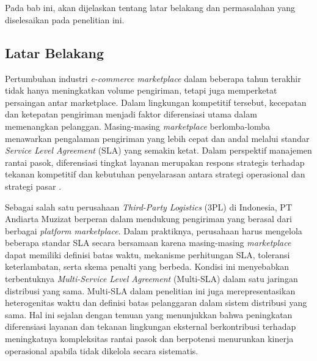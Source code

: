 \chapter{\babSatu}
\label{bab:1}
Pada bab ini, akan dijelaskan tentang latar belakang dan permasalahan yang diselesaikan pada penelitian ini.


\section{Latar Belakang}
\label{sec:latarBelakang}

Pertumbuhan industri \textit{e-commerce marketplace} dalam beberapa tahun terakhir tidak hanya meningkatkan volume pengiriman, tetapi juga memperketat persaingan antar marketplace. Dalam lingkungan kompetitif tersebut, kecepatan dan ketepatan pengiriman menjadi faktor diferensiasi utama dalam memenangkan pelanggan. Masing-masing \textit{marketplace} berlomba-lomba menawarkan pengalaman pengiriman yang lebih cepat dan andal melalui standar \textit{Service Level Agreement} (SLA) yang semakin ketat. Dalam perspektif manajemen rantai pasok, diferensiasi tingkat layanan merupakan respons strategis terhadap tekanan kompetitif dan kebutuhan penyelarasan antara strategi operasional dan strategi pasar \citep{book:chopra}.

Sebagai salah satu perusahaan \textit{Third-Party Logistics }(3PL) di Indonesia, PT Andiarta Muzizat berperan dalam mendukung pengiriman yang berasal dari berbagai \textit{platform marketplace}. Dalam praktiknya, perusahaan harus mengelola beberapa standar SLA secara bersamaan karena masing-masing \textit{marketplace} dapat memiliki definisi batas waktu, mekanisme perhitungan SLA, toleransi keterlambatan, serta skema penalti yang berbeda. Kondisi ini menyebabkan terbentuknya \textit{Multi-Service Level Agreement} (Multi-SLA) dalam satu jaringan distribusi yang sama. Multi-SLA dalam penelitian ini juga merepresentasikan heterogenitas  waktu dan definisi batas pelanggaran dalam sistem distribusi yang sama. Hal ini sejalan dengan temuan \citep{ates2022} yang menunjukkan bahwa peningkatan diferensiasi layanan dan tekanan lingkungan eksternal berkontribusi terhadap meningkatnya kompleksitas rantai pasok dan berpotensi menurunkan kinerja operasional apabila tidak dikelola secara sistematis.

